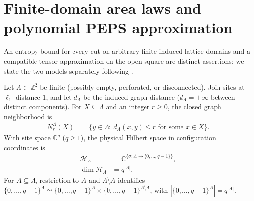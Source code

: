 \section{Finite-domain area laws and polynomial PEPS approximation}
\label{sec:finite_domain_area_law}

An entropy bound for every cut on arbitrary finite induced lattice domains and a
compatible tensor approximation on the open square are distinct assertions; we
state the two models separately following
\cite{OpenAI2026AreaLaw,OpenAI2026PolynomialPEPS}.

\begin{definition}
    \label{def:area_law_domain}
    \leanok
    Let $\Lambda\subset\mathbb Z^2$ be finite (possibly empty, perforated, or
    disconnected). Join sites at $\ell_1$-distance $1$, and let $d_\Lambda$ be
    the induced-graph distance ($d_\Lambda=+\infty$ between distinct components).
    For $X\subseteq\Lambda$ and an integer $r\ge0$, the closed graph neighborhood is
    \begin{align}
        N_r^\Lambda(X) & =\{y\in\Lambda:\ d_\Lambda(x,y)\le r
        \text{ for some }x\in X\}.
        \label{eq:area_law_graph_neighborhood}
    \end{align}
    With site space $\mathbb C^q$ ($q\ge1$), the physical Hilbert space in
    configuration coordinates is
    \begin{align}
        \label{eq:area_law_state_space}
        \mathcal H_\Lambda     & =\mathbb C^{\{\sigma:\Lambda\to\{0,\ldots,q-1\}\}}, \\
        \label{eq:area_law_dimension}
        \dim\mathcal H_\Lambda & =q^{|\Lambda|}.
    \end{align}
    For $A\subseteq\Lambda$, restriction to $A$ and $\Lambda\setminus A$
    identifies $\{0,\ldots,q-1\}^\Lambda\simeq
        \{0,\ldots,q-1\}^A\times\{0,\ldots,q-1\}^{\Lambda\setminus A}$, with
    $|\{0,\ldots,q-1\}^A|=q^{|A|}$.
\end{definition}

